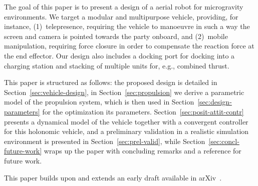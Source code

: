 The goal of this paper is to present a design of a aerial robot for
microgravity environments. We target a modular and multipurpose
vehicle, providing, for instance, (1)~telepresence, requiring the
vehicle to manoeuvre in such a way the screen and camera is pointed
towards the party onboard, and (2)~mobile manipulation, requiring
force closure in order to compensate the reaction force at the end
effector. Our design also includes a docking port for docking into a
charging station and stacking of multiple units for, e.g., combined
thrust.

This paper is structured as follows: the proposed design is detailed in
Section~\ref{sec:vehicle-design}, in Section~\ref{sec:propulsion} we
derive a parametric model of the propulsion system, which is then used
in Section~\ref{sec:design-parameters} for the optimization its
parameters. Section~\ref{sec:posit-attit-contr} presents a dynamical
model of the vehicle together with a
convergent controller for this holonomic vehicle, and a
preliminary validation in a realistic simulation environment is
presented in Section~\ref{sec:prel-valid}, while
Section~\ref{sec:concl-future-work} wraps up the paper with concluding
remarks and a reference for future work.

This paper builds upon and extends an early draft available in
arXiv~\cite{yoda:arxiv16}.

